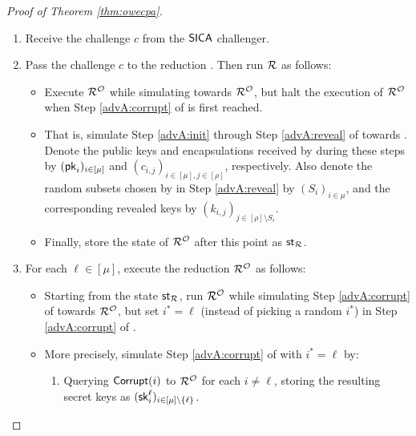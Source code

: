 \begin{proof}[Proof of Theorem \ref{thm:owecpa}]
  \begin{enumerate}[itemsep=0.1cm]
    \item Receive the challenge \(c\) from the \(\mathsf{SICA}\) challenger.
    \item Pass the challenge \(c\) to the reduction \redR. Then run \(\redR\) as follows:
          \begin{itemize}[label={\textbullet},itemsep=0.1cm]
            \item Execute \(\redR^{\oracle}\) while simulating \advA towards \(\redR^{\oracle}\),
                  but halt the execution of \(\redR^{\oracle}\)
                  when Step \ref{advA:corrupt} of \advA is first reached.
            \item That is, simulate Step \ref{advA:init} through Step \ref{advA:reveal} of \advA towards \redR.
                  Denote the public keys and encapsulations
                  received by \advA during these steps by \((\mathsf{pk}_{i})_{i \in [\mu]}\) and
                  \((c_{i,j})_{i \in [\mu], j \in [\rho]}\), respectively.
                  Also denote the random subsets chosen by \advA in Step \ref{advA:reveal}
                  by \((S_{i})_{i \in \mu}\),
                  and the corresponding revealed keys by \((k_{i,j})_{j \in [\rho] \setminus S_{i}}\).
            \item Finally, store the state of \(\redR^{\oracle}\) after this point as \(\state_{\redR}\).
          \end{itemize}
    \item\label{advM:rewind}
          For each \(\ell \in [\mu]\), execute the reduction \(\redR^{\oracle}\) as follows:
          \begin{itemize}[label={\textbullet},itemsep=0.1cm]
            \item Starting from the state \(\state_{\redR}\),
                  run \(\redR^{\oracle}\) while simulating Step
                  \ref{advA:corrupt} of \advA towards \(\redR^{\oracle}\),
                  but set \(i^{*} = \ell\) (instead of picking a random \(i^{*}\))
                  in Step \ref{advA:corrupt} of \advA.
            \item More precisely, simulate Step \ref{advA:corrupt} of \advA with \(i^{*} = \ell\) by:
                  \begin{enumerate}[topsep=0.1cm,itemsep=0.1cm,ref=(\alph*)]
                    \item Querying \(\mathsf{Corrupt}(i)\) to \(\redR^{\oracle}\) for each \(i \ne \ell\),
                          storing the resulting secret keys as \((\mathsf{sk}_{i}^{\ell})_{i \in [\mu] \setminus \{\ell\}}\).

\end{enumerate}
\end{itemize}
\end{enumerate}
\end{proof}
